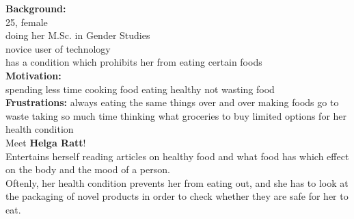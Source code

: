 \documentclass[a4paper,10pt,oneside]{scrreprt}
\begin{document}
		\begin{mdframed}
			\begin{minipage}{\textwidth}
				\begin{figure}
					\centering
					\vspace{-4cm}
				\end{figure}
				
				
				\textbf{Background:}\\
				25, female\\
				doing her M.Sc. in Gender Studies\\
				novice user of technology\\
				has a condition which prohibits her from eating certain foods\\
				
				
				\textbf{Motivation:}\\
				spending less time cooking food
				eating healthy
				not wasting food\\
				
				
				\textbf{Frustrations:}
				always eating the same things over and over
				making foods go to waste
				taking so much time thinking what groceries to buy
				limited options for her health condition	\\
				
				
				Meet \textbf{Helga Ratt}!\\
				
				Entertains herself reading articles on healthy food and what food has which effect on the body and the mood of a person.\\
				
				
				
				Oftenly, her health condition prevents her from eating out, and she has to look at the packaging of novel products in order to check whether they are safe for her to eat.\\
				

\end{minipage}
\end{mdframed}
\end{document}
